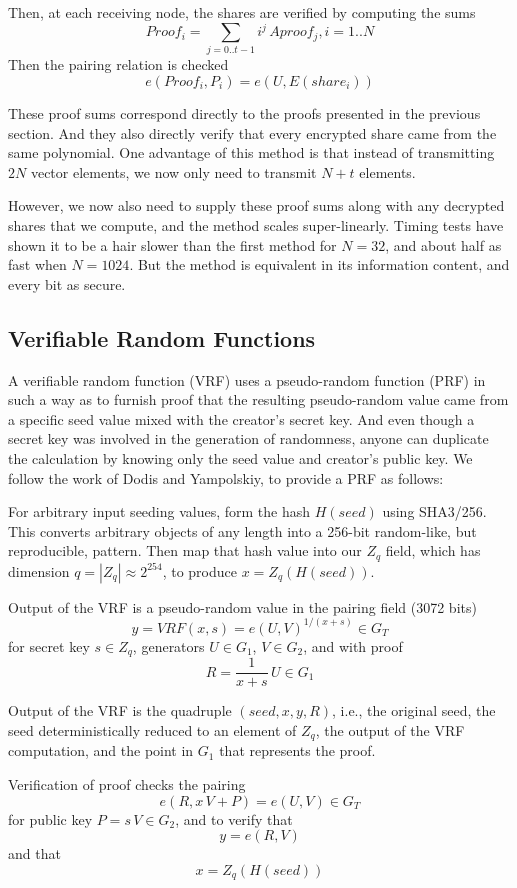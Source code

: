 \documentclass{yellowpaper}
\begin{document}
Then, at each receiving node, the shares are verified by computing the sums
$$ Proof_i = \sum_{j=0..t-1} i^j\, Aproof_j, i = 1..N$$
Then the pairing relation is checked
$$e(Proof_i, P_i) = e(U,E(share_i))$$

These proof sums correspond directly to the proofs presented in the previous section. And they also directly verify that every encrypted share came from the same polynomial. One advantage of this method is that instead of transmitting $2 N$ vector elements, we now only need to transmit $N+t$ elements.

However, we now also need to supply these proof sums along with any decrypted shares that we compute, and the method scales super-linearly. Timing tests have shown it to be a hair slower than the first method for $N=32$, and about half as fast when $N=1024$. But the method is equivalent in its information content, and every bit as secure.
\subsection{Verifiable Random Functions}
A verifiable random function (VRF)\cite{vrf2} uses a pseudo-random function (PRF) in such a way as to furnish proof that the resulting pseudo-random value came from a specific seed value mixed with the creator's secret key. And even though a secret key was involved in the generation of randomness, anyone can duplicate the calculation by knowing only the seed value and creator's public key. We follow the work of Dodis and Yampolskiy\cite{vrf}, to provide a PRF as follows:

For arbitrary input seeding values, form the hash $H(seed)$ using SHA3/256. This converts arbitrary objects of any length into a 256-bit random-like, but reproducible, pattern. Then map that hash value into our $Z_q$ field, which has dimension $q = |Z_q| \approx 2^{254}$, to produce $x = Z_q(H(seed))$.

Output of the VRF is a pseudo-random value in the pairing field (3072 bits) 
$$y = VRF(x, s) = e(U,V)^{1/(x + s)} \in G_T$$ 
for secret key $s \in Z_q$,  generators $U \in G_1$, $V \in G_2$, and with proof 
$$R = \frac{1}{x+s}\,U \in G_1$$ 

Output of the VRF is the quadruple $(seed, x, y, R)$, i.e., the original seed, the seed deterministically reduced to an element of $Z_q$, the output of the VRF computation, and the point in $G_1$ that represents the proof.

Verification of proof checks the pairing $$e(R, x \, V + P) = e(U,V)  \in G_T$$ for public key $P = s \, V \in G_2$, and to verify that $$y = e(R,V)$$ and that $$x = Z_q(H(seed))$$
\end{document}
